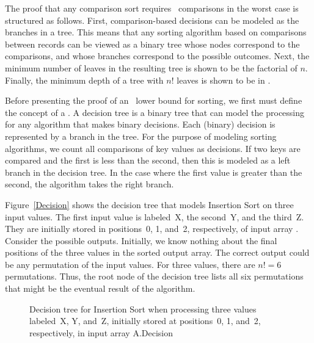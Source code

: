 The proof that any comparison sort requires \Omeganlogn\
comparisons in the worst case is structured as follows.
First, comparison-based decisions can be modeled as the
branches in a tree.
This means that any sorting algorithm based on comparisons between
records can be viewed as a binary tree whose nodes correspond to the
comparisons, and whose branches correspond to the possible outcomes.
Next, the minimum number of leaves in the resulting tree is
shown to be the factorial of \(n\).
Finally, the minimum depth of a tree with \(n!\) leaves is shown
to be in \Omeganlogn.

Before presenting the proof of an \Omeganlogn\ lower bound for
sorting, we first must define the concept of a
.
A decision tree is a binary tree that can model the processing for any
algorithm that makes binary decisions.
Each (binary) decision is represented by a branch in the tree.
For the purpose of modeling sorting algorithms, we count all
comparisons of key values as decisions.
If two keys are compared and the first is less than the second, then
this is modeled as a left branch in the decision tree.
In the case where the first value is greater than the second, the
algorithm takes the right branch.

Figure~\ref{Decision} shows the decision tree that models
Insertion Sort on three input values.
The first input value is labeled~X, the second~Y, and the third~Z.
They are initially stored in positions~0, 1, and~2, respectively,
of input array \Cref{A}.
Consider the possible outputs.
Initially, we know nothing about the final positions of the three
values in the sorted output array.
The correct output could be any permutation of the input values.
For three values, there are \(n! = 6\) permutations.
Thus, the root node of the decision tree lists all six permutations
that might be the eventual result of the algorithm.

\begin{figure}
\vspace{-\bigskipamount}

{Decision tree for Insertion Sort when processing three values
labeled~X, Y, and~Z, initially stored at positions~0, 1, and~2,
respectively, in input array A.}{Decision}
\vspace{1pt}
\end{figure}

